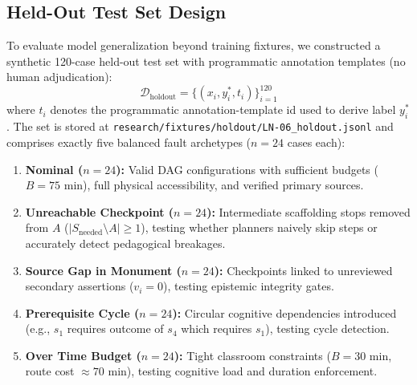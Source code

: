 \documentclass[11pt,a4paper]{article}
\begin{document}
\subsection{Held-Out Test Set Design}
To evaluate model generalization beyond training fixtures, we constructed a synthetic 120-case held-out test set with programmatic annotation templates (no human adjudication):
\begin{equation}
\mathcal{D}_{\text{holdout}} = \{ (x_i, y_i^*, t_i) \}_{i=1}^{120}
\end{equation}
where $t_i$ denotes the programmatic annotation-template id used to derive label $y_i^*$. The set is stored at \texttt{research/fixtures/holdout/LN-06\_holdout.jsonl} and comprises exactly five balanced fault archetypes ($n = 24$ cases each):
\begin{enumerate}
    \item \textbf{Nominal ($n=24$):} Valid DAG configurations with sufficient budgets ($B = 75$ min), full physical accessibility, and verified primary sources.
    \item \textbf{Unreachable Checkpoint ($n=24$):} Intermediate scaffolding stops removed from $A$ ($|S_{\text{needed}} \setminus A| \ge 1$), testing whether planners naively skip steps or accurately detect pedagogical breakages.
    \item \textbf{Source Gap in Monument ($n=24$):} Checkpoints linked to unreviewed secondary assertions ($v_i = 0$), testing epistemic integrity gates.
    \item \textbf{Prerequisite Cycle ($n=24$):} Circular cognitive dependencies introduced (e.g., $s_1$ requires outcome of $s_4$ which requires $s_1$), testing cycle detection.
    \item \textbf{Over Time Budget ($n=24$):} Tight classroom constraints ($B = 30$ min, route cost $\approx 70$ min), testing cognitive load and duration enforcement.
\end{enumerate}
\end{document}
